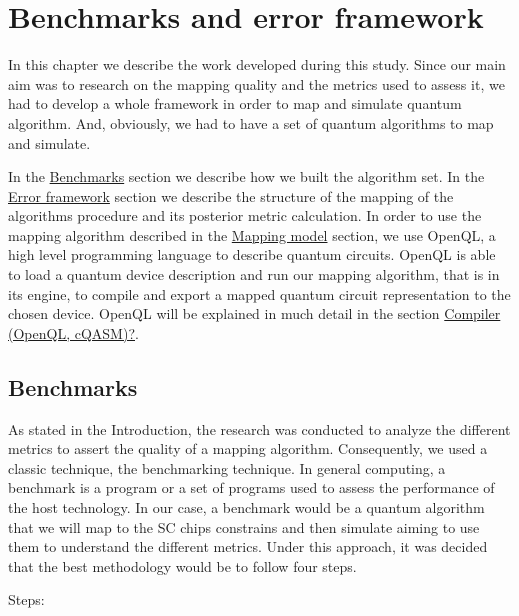 
\chapter*{Benchmarks and error framework}
\label{sec:orgaf2fef4}

In this chapter we describe the work developed during this study.
Since our main aim was to research on the mapping quality and the metrics used to assess it, we had to develop a whole framework in order to map and simulate quantum algorithm.
And, obviously, we had to have a set of quantum algorithms to map and simulate.

In the \hyperref[sec:orgf61c758]{Benchmarks} section we describe how we built the algorithm set.
In the \hyperref[sec:org8b63c1b]{Error framework} section we describe the structure of the mapping of the algorithms procedure and its posterior metric calculation.
In order to use the mapping algorithm described in the \href{chapter-3.org}{Mapping model} section, we use OpenQL, a high level programming language to describe quantum circuits.
OpenQL is able to load a quantum device description and run our mapping algorithm, that is in its engine, to compile and export a mapped quantum circuit representation to the chosen device.
OpenQL will be explained in much detail in the section \hyperref[sec:org7871930]{Compiler (OpenQL, cQASM)?}.

\section*{Benchmarks}
\label{sec:orgf61c758}
As stated in the Introduction, the research was conducted to analyze the different metrics to assert the quality of a mapping algorithm.
Consequently, we used a classic technique, the benchmarking technique.
In general computing, a benchmark is a program or a set of programs used to assess the performance of the host technology.
In our case, a benchmark would be a quantum algorithm that we will map to the SC chips constrains and then simulate aiming to use them to understand the different metrics.
Under this approach, it was decided that the best methodology would be to follow four steps.

Steps:


